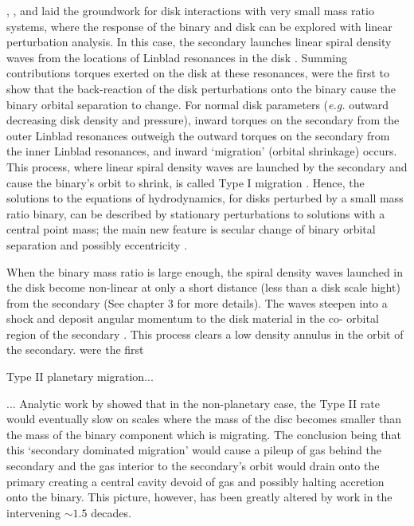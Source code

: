 \cite{LinPapa:1979a}, \cite{GT79}, and \cite{GT80} laid the groundwork for
disk interactions with very small mass ratio systems, where the response of
the binary and disk can be explored with linear perturbation analysis. In this
case, the secondary launches linear spiral density waves from the locations of
Linblad resonances in the disk \citep{LyndenBellKalnajs:1972}. Summing
contributions torques exerted on the disk at these resonances, \cite{GT80}
were the first to show that the back-reaction of the disk perturbations onto
the binary cause the binary orbital separation to change. For normal disk
parameters (\emph{e.g.} outward decreasing disk density and pressure), inward
torques on the secondary from the outer Linblad resonances outweigh the
outward torques on the secondary from the inner Linblad resonances, and inward
`migration' (orbital shrinkage) occurs. This process, where linear spiral
density waves are launched by the secondary and cause the binary's orbit to
shrink, is called Type I migration \citep[See also][]{MeyerVernetSicardy:1987,
Ward:1997}. Hence, the solutions to the equations of hydrodynamics, for disks
perturbed by a small mass ratio binary, can be described by stationary
perturbations to solutions with a central point mass; the main new feature is
secular change of binary orbital separation and possibly eccentricity
\citep{GT80, Ward:1988, GoldriechSari:2003}.





When the binary mass ratio is large enough, the spiral density waves launched
in the disk become non-linear at only a short distance (less than a disk scale
hight) from the secondary (See chapter 3 for more details). The waves steepen
into a shock and deposit angular momentum to the disk material in the co-
orbital region of the secondary \citep{RafikovDong:2011, LinPapa, chapter
3...}. This process clears a low density annulus in the orbit of the secondary.
\cite{LinPapa:1986b} were the first

Type II planetary migration...

... Analytic work by \citep{SyerClarke:95, Ivanov:1999} showed that in the
non-planetary case, the Type II rate would eventually slow on scales where the
mass of the disc becomes smaller than the mass of the binary component which
is migrating. The conclusion being that this `secondary dominated migration'
would cause a pileup of gas behind the secondary and the gas interior to the
secondary's orbit would drain onto the primary creating a central cavity
devoid of gas and possibly halting accretion onto the binary. This picture,
however, has been greatly altered by work in the intervening $\sim 1.5$
decades.




